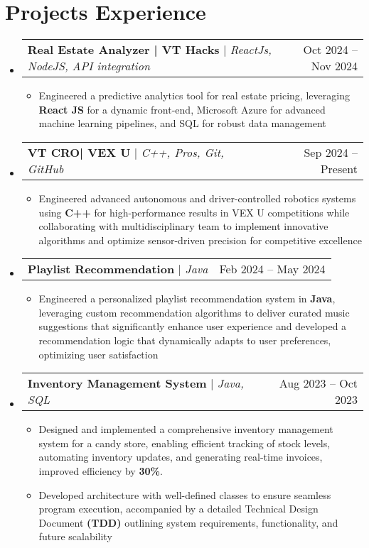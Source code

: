 \documentclass[a4paper,11pt]{article}
\makeatletter
\newcommand{\resumeItem}[1]{
  \item\small{
    {#1 \vspace{-2pt}}
  }
}
\newcommand{\resumeProjectHeading}[2]{
    \item
    \begin{tabular*}{0.97\textwidth}{l@{\extracolsep{\fill}}r}
      \small#1 & #2 \\
    \end{tabular*}\vspace{-7pt}
}
\newcommand{\resumeSubHeadingListStart}{\begin{itemize}[leftmargin=0.15in, label={}]}
\newcommand{\resumeSubHeadingListEnd}{\end{itemize}}
\newcommand{\resumeItemListStart}{\begin{itemize}}
\newcommand{\resumeItemListEnd}{\end{itemize}\vspace{-5pt}}
\makeatother
\begin{document}
\section{Projects Experience}
    \resumeSubHeadingListStart
      \resumeProjectHeading
        {\textbf{Real Estate Analyzer | VT Hacks} $|$ \emph{ReactJs, NodeJS, API integration}} {Oct 2024 -- Nov 2024}
        \resumeItemListStart
         \resumeItem{Engineered a predictive analytics tool for real estate pricing, leveraging \textbf{React JS} for a dynamic front-end, Microsoft Azure for advanced machine learning pipelines, and SQL for robust data management}
        \resumeItemListEnd
      \resumeProjectHeading
        {\textbf{VT CRO| VEX U} $|$ \emph{C++, Pros, Git, GitHub}}{Sep 2024 -- Present}
        \resumeItemListStart
         \resumeItem{Engineered advanced autonomous and driver-controlled robotics systems using \textbf{C++} for high-performance results in VEX U competitions while collaborating with multidisciplinary team to implement innovative algorithms and optimize sensor-driven precision for competitive excellence}
        \resumeItemListEnd
      \resumeProjectHeading
        {\textbf{Playlist Recommendation} $|$ \emph{Java}}{Feb 2024 -- May 2024}
        \resumeItemListStart
         \resumeItem{Engineered a personalized playlist recommendation system in \textbf{Java}, leveraging custom recommendation algorithms to deliver curated music suggestions that significantly enhance user experience and developed a recommendation logic that dynamically adapts to user preferences, optimizing user satisfaction}
        \resumeItemListEnd
      \resumeProjectHeading
        {\textbf{Inventory Management System} $|$ \emph{Java, SQL}}{Aug 2023 -- Oct 2023}
        \resumeItemListStart
         \resumeItem{Designed and implemented a comprehensive inventory management system for a candy store, enabling efficient tracking of stock levels, automating inventory updates, and generating real-time invoices, improved efficiency by \textbf{30\%}.}
         \resumeItem{Developed architecture with well-defined classes to ensure seamless program execution, accompanied by a detailed Technical Design Document \textbf{(TDD)} outlining system requirements, functionality, and future scalability}
        \resumeItemListEnd
    \resumeSubHeadingListEnd

\end{document}
